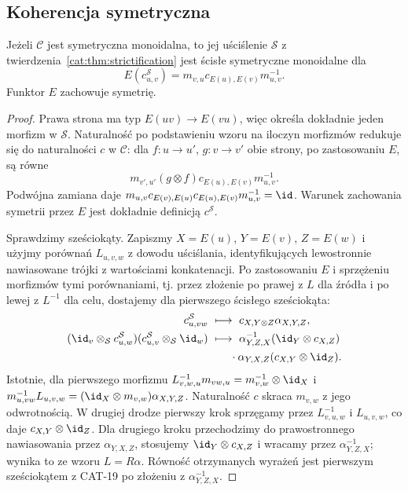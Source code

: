 \subsection{Koherencja symetryczna}
\begin{lemat}\label{cat:lem:strict-symmetry}
Jeżeli $\mathcal C$ jest symetryczna monoidalna, to jej uściślenie $\mathcal S$ z twierdzenia~\ref{cat:thm:strictification} jest ścisłe symetryczne monoidalne dla
\[
E(c^{\mathcal S}_{u,v})=m_{v,u}c_{E(u),E(v)}m_{u,v}^{-1}.
\]
Funktor $E$ zachowuje symetrię.
\end{lemat}
\begin{proof}
Prawa strona ma typ $E(uv)\to E(vu)$, więc określa dokładnie jeden morfizm w $\mathcal S$. Naturalność po podstawieniu wzoru na iloczyn morfizmów redukuje się do naturalności $c$ w $\mathcal C$: dla $f:u\to u'$, $g:v\to v'$ obie strony, po zastosowaniu $E$, są równe
\[
m_{v',u'}(g\otimes f)c_{E(u),E(v)}m_{u,v}^{-1}.
\]
Podwójna zamiana daje $m_{u,v}c_{E(v),E(u)}c_{E(u),E(v)}m_{u,v}^{-1}=\id$. Warunek zachowania symetrii przez $E$ jest dokładnie definicją $c^{\mathcal S}$.

Sprawdzimy sześciokąty. Zapiszmy $X=E(u)$, $Y=E(v)$, $Z=E(w)$ i użyjmy porównań $L_{u,v,w}$ z dowodu uściślania, identyfikujących lewostronnie nawiasowane trójki z wartościami konkatenacji. Po zastosowaniu $E$ i sprzężeniu morfizmów tymi porównaniami, tj. przez złożenie po prawej z $L$ dla źródła i po lewej z $L^{-1}$ dla celu, dostajemy dla pierwszego ścisłego sześciokąta:
\[
\begin{aligned}
c^{\mathcal S}_{u,vw}&\ \longmapsto\
 c_{X,Y\otimes Z}\alpha_{X,Y,Z},\\
(\id_v\otimes_{\mathcal S} c^{\mathcal S}_{u,w})
(c^{\mathcal S}_{u,v}\otimes_{\mathcal S}\id_w)
&\ \longmapsto\
 \alpha_{Y,Z,X}^{-1}(\id_Y\otimes c_{X,Z})\\
&\qquad{}\cdot\alpha_{Y,X,Z}(c_{X,Y}\otimes\id_Z).
\end{aligned}
\]
Istotnie, dla pierwszego morfizmu $L_{v,w,u}^{-1}m_{vw,u}=m_{v,w}^{-1}\otimes\id_X$ i $m_{u,vw}^{-1}L_{u,v,w}=(\id_X\otimes m_{v,w})\alpha_{X,Y,Z}$. Naturalność $c$ skraca $m_{v,w}$ z jego odwrotnością. W drugiej drodze pierwszy krok sprzęgamy przez $L_{v,u,w}^{-1}$ i $L_{u,v,w}$, co daje $c_{X,Y}\otimes\id_Z$. Dla drugiego kroku przechodzimy do prawostronnego nawiasowania przez $\alpha_{Y,X,Z}$, stosujemy $\id_Y\otimes c_{X,Z}$ i wracamy przez $\alpha_{Y,Z,X}^{-1}$; wynika to ze wzoru $L=R\alpha$. Równość otrzymanych wyrażeń jest pierwszym sześciokątem z CAT-19 po złożeniu z $\alpha_{Y,Z,X}^{-1}$.


\end{proof}
